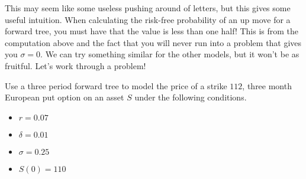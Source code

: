 \documentclass{ximera}
\begin{document}
This may seem like some useless pushing around of letters, but this gives some useful intuition. When calculating the risk-free probability of an up move for a forward tree, you must have that the value is less than one half! This is from the computation above and the fact that you will never run into a problem that gives you $\sigma=0$. We can try something similar for the other models, but it won't be as fruitful. Let's work through a problem!

\begin{example}
Use a three period forward tree to model the price of a strike $112$, three month European put option on an asset $S$ under the following conditions.
	\begin{itemize}
	\item $r=0.07$
	\item $\delta=0.01$
	\item $\sigma=0.25$
	\item $S(0)=110$
	\end{itemize}
\end{example}
\end{document}
